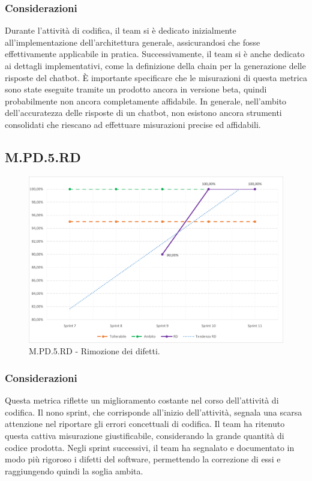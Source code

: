 \documentclass[10pt, a4paper]{article}
\begin{document}
\subsubsection{Considerazioni}
Durante l'attività di codifica, il team si è dedicato inizialmente all'implementazione dell'architettura generale, assicurandosi che fosse effettivamente applicabile in pratica. Successivamente, il team si è anche dedicato ai dettagli implementativi, come la definizione della chain per la generazione delle risposte del chatbot. È importante specificare che le misurazioni di questa metrica sono state eseguite tramite un prodotto ancora in versione beta, quindi probabilmente non ancora completamente affidabile. In generale, nell'ambito dell'accuratezza delle risposte di un chatbot, non esistono ancora strumenti consolidati che riescano ad effettuare misurazioni precise ed affidabili.

\subsection{M.PD.5.RD}
\begin{figure}[H] \includegraphics[width=15.5cm]{img/metriche/MPD5RD.png} \caption{M.PD.5.RD - Rimozione dei difetti.} \end{figure} \subsubsection{Considerazioni}
Questa metrica riflette un miglioramento costante nel corso dell'attività di codifica. Il nono sprint, che corrisponde all'inizio dell'attività, segnala una scarsa attenzione nel riportare gli errori concettuali di codifica. Il team ha ritenuto questa cattiva misurazione giustificabile, considerando la grande quantità di codice prodotta. Negli sprint successivi, il team ha segnalato e documentato in modo più rigoroso i difetti del software, permettendo la correzione di essi e raggiungendo quindi la soglia ambita.
\end{document}
